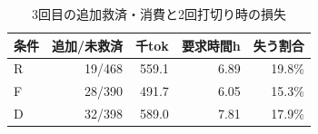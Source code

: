 \begin{table}[tb]
\centering
\caption{3回目の追加救済・消費と2回打切り時の損失}
\label{tab:third}
\begin{tabular}{lrrrr}
\hline
条件 & 追加/未救済 & 千tok & 要求時間h & 失う割合 \\
\hline
R & 19/468 & 559.1 & 6.89 & 19.8\% \\
F & 28/390 & 491.7 & 6.05 & 15.3\% \\
D & 32/398 & 589.0 & 7.81 & 17.9\% \\
\hline
\end{tabular}
\end{table}
